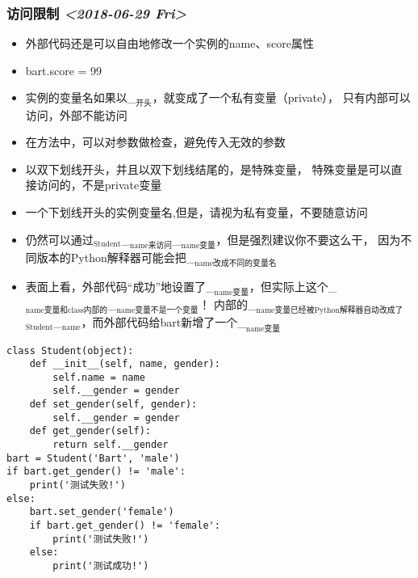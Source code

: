 \documentclass[11pt]{article}
\begin{document}
\subsubsection{访问限制 \textit{<2018-06-29 Fri>}}
\label{sec:org272c06c}
\begin{itemize}
\item 外部代码还是可以自由地修改一个实例的name、score属性
\item bart.score = 99
\item 实例的变量名如果以\_\(_{\text{开头}}\)，就变成了一个私有变量（private），
只有内部可以访问，外部不能访问
\item 在方法中，可以对参数做检查，避免传入无效的参数
\item 以双下划线开头，并且以双下划线结尾的，是特殊变量，
特殊变量是可以直接访问的，不是private变量
\item 一个下划线开头的实例变量名,但是，请视为私有变量，不要随意访问
\item 仍然可以通过\(_{\text{Student}}\)\_\(_{\text{name来访问}}\)\_\(_{\text{name变量}}\)，但是强烈建议你不要这么干，
因为不同版本的Python解释器可能会把\_\(_{\text{name改成不同的变量名}}\)
\item 表面上看，外部代码“成功”地设置了\_\(_{\text{name变量}}\)，但实际上这个\_\(_{\text{name变量和class内部的}}\)\_\(_{\text{name变量不是一个变量}}\)！
内部的\_\(_{\text{name变量已经被Python解释器自动改成了}}\)\(_{\text{Student}}\)\_\(_{\text{name}}\)，而外部代码给bart新增了一个\_\(_{\text{name变量}}\)
\end{itemize}
\begin{verbatim}
class Student(object):
    def __init__(self, name, gender):
        self.name = name
        self.__gender = gender
    def set_gender(self, gender):
        self.__gender = gender
    def get_gender(self):
        return self.__gender
bart = Student('Bart', 'male')
if bart.get_gender() != 'male':
    print('测试失败!')
else:
    bart.set_gender('female')
    if bart.get_gender() != 'female':
        print('测试失败!')
    else:
        print('测试成功!')

\end{verbatim}
\end{document}
